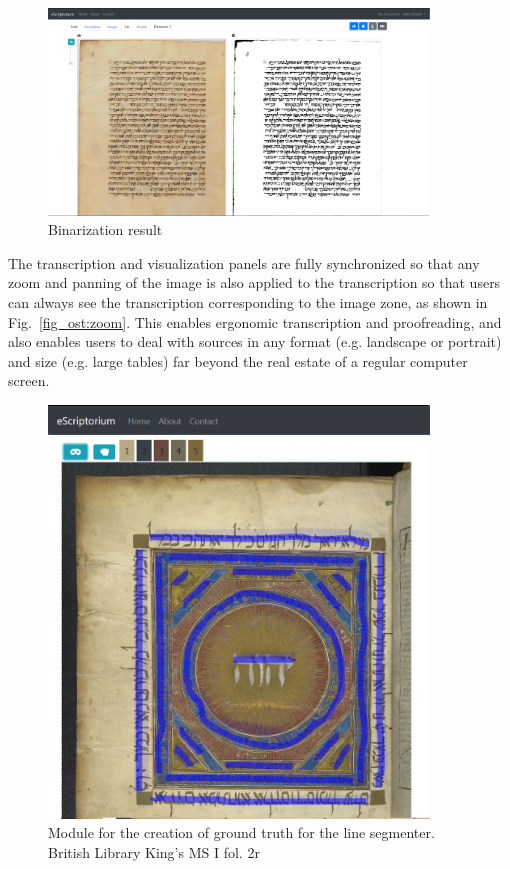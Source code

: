 \begin{figure}
	\centering
	\includegraphics[width=0.9\textwidth]{binarization_example.png}
	\caption{Binarization result}
\end{figure}

The transcription and visualization panels are fully synchronized so that any
zoom and panning of the image is also applied to the transcription so that
users can always see the transcription corresponding to the image zone, as
shown in Fig.~\ref{fig_ost:zoom}. This enables ergonomic transcription and
proofreading, and also enables users to deal with sources in any format (e.g.
landscape or portrait) and size (e.g. large tables) far beyond the real estate
of a regular computer screen.

\begin{figure}
	\centering
	\includegraphics[width=0.9\textwidth]{spanish.png}
	\caption{Module for the creation of ground truth for the line segmenter. British Library King’s MS I fol. 2r}
	\label{fig_ost:baseline}
\end{figure}

